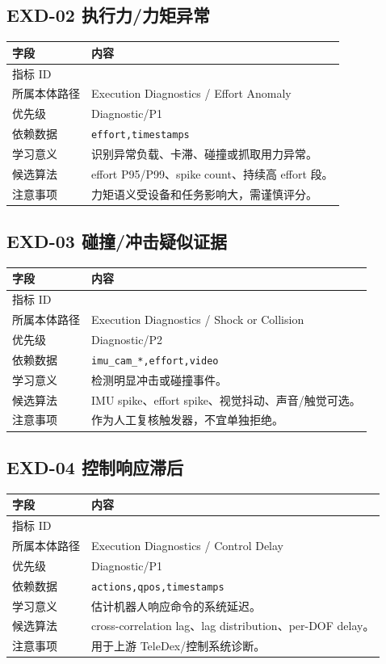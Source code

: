 \documentclass[UTF8,zihao=-4]{ctexart}
\newcommand{\Code}[1]{\texttt{#1}}
\newcommand{\MID}[1]{\texttt{\seqsplit{#1}}}
\begin{document}
\subsection{EXD-02 执行力/力矩异常}

\begin{longtable}{L{3.6cm} L{9.6cm}}
\toprule
字段 & 内容 \\
\midrule
指标 ID & \MID{EXD-02} \\
所属本体路径 & Execution Diagnostics / Effort Anomaly \\
优先级 & Diagnostic/P1 \\
依赖数据 & \Code{effort,timestamps} \\
学习意义 & 识别异常负载、卡滞、碰撞或抓取用力异常。 \\
候选算法 & effort P95/P99、spike count、持续高 effort 段。 \\
注意事项 & 力矩语义受设备和任务影响大，需谨慎评分。 \\
\bottomrule
\end{longtable}

\subsection{EXD-03 碰撞/冲击疑似证据}

\begin{longtable}{L{3.6cm} L{9.6cm}}
\toprule
字段 & 内容 \\
\midrule
指标 ID & \MID{EXD-03} \\
所属本体路径 & Execution Diagnostics / Shock or Collision \\
优先级 & Diagnostic/P2 \\
依赖数据 & \Code{imu\_cam\_*,effort,video} \\
学习意义 & 检测明显冲击或碰撞事件。 \\
候选算法 & IMU spike、effort spike、视觉抖动、声音/触觉可选。 \\
注意事项 & 作为人工复核触发器，不宜单独拒绝。 \\
\bottomrule
\end{longtable}

\subsection{EXD-04 控制响应滞后}

\begin{longtable}{L{3.6cm} L{9.6cm}}
\toprule
字段 & 内容 \\
\midrule
指标 ID & \MID{EXD-04} \\
所属本体路径 & Execution Diagnostics / Control Delay \\
优先级 & Diagnostic/P1 \\
依赖数据 & \Code{actions,qpos,timestamps} \\
学习意义 & 估计机器人响应命令的系统延迟。 \\
候选算法 & cross-correlation lag、lag distribution、per-DOF delay。 \\
注意事项 & 用于上游 TeleDex/控制系统诊断。 \\
\bottomrule
\end{longtable}
\end{document}
